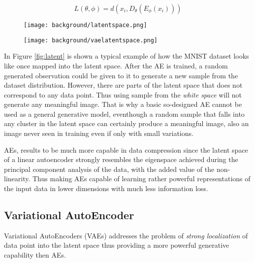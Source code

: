 \begin{equation}
\label{eq:aeloss}
  L(\theta ,\phi ) = d(x_{i},D_{\theta }(E_{\phi }(x_{i})))
\end{equation}

\begin{figure}[h]
  \begin{minipage}{.5\textwidth}
    \centering
    \captionsetup{margin=0.8cm}
    \texttt{[image: background/latentspace.png]}
    \label{fig:latent}
  \end{minipage}%
  \begin{minipage}{.5\textwidth}
      \centering
      \captionsetup{margin=0.8cm}
      \texttt{[image: background/vaelatentspace.png]}
      \label{fig:vaelatent}
  \end{minipage}
\end{figure}

In Figure \ref{fig:latent} is shown a typical example of how the MNIST dataset looks like once mapped into the latent space. After the AE is trained, a random generated observation could be given to it to generate a new sample from the dataset distribution. However, there are parts of the latent space that does not correspond to any data point. Thus using sample from the \textit{white space} will not generate any meaningful image. That is why a basic so-designed AE cannot be used as a general generative model, eventhough a random sample that falls into any cluster in the latent space can certainly produce a meaningful image, also an image never seen in training even if only with small variations. 

AEs, results to be much more capable in data compression since the latent space of a linear autoencoder strongly resembles the eigenspace achieved during the principal component analysis of the data, with the added value of the non-linearity. Thus making AEs capable of learning rather powerful representations of the input data in lower dimensions with much less information loss.


\subsection{Variational AutoEncoder}

Variational AutoEncoders (VAEs) addresses the problem of \textit{strong localization} of data point into the latent space thus providing a more powerful generative capability then AEs.

